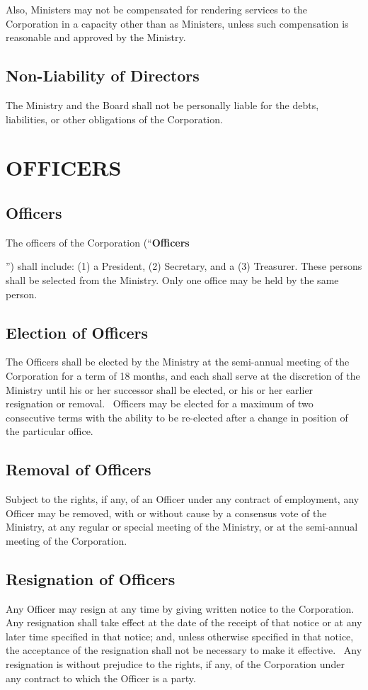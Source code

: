 \documentclass[letterpaper,titlepage]{article}
\newcommand{\defn}[1]{\refstepcounter{defn}\textbf{#1}\addcontentsline{defn}{defn}{\protect\numberline{\thedefn}#1}}
\begin{document}
Also, Ministers may not be compensated for rendering services to the
Corporation in a capacity other than as Ministers, unless such compensation is
reasonable and approved by the Ministry.
\subsection{Non-Liability of Directors}
\label{sec:nonliability}
The Ministry and the Board shall not be personally liable for the debts,
liabilities, or other obligations of the Corporation.
\section{OFFICERS}
\label{sec:officers}
\subsection{Officers}
\label{sec:officers2}
The officers of the Corporation (``\defn{Officers}'') shall include: (1) a
President, (2) Secretary, and a (3) Treasurer. These persons shall be selected
from the Ministry. Only one office may be held by the same person.
\subsection{Election of Officers}
\label{sec:electionOfficers}
The Officers shall be elected by the Ministry at the semi-annual meeting of the
Corporation for a term of 18 months, and each shall serve at the discretion of
the Ministry until his or her successor shall be elected, or his or her earlier
resignation or removal.  Officers may be elected for a maximum of two
consecutive terms with the ability to be re-elected after a change in position
of the particular office. 
\subsection{Removal of Officers}
\label{sec:removalOfficers}
Subject to the rights, if any, of an Officer under any contract of employment,
any Officer may be removed, with or without cause by a consensus vote of
the Ministry, at any regular or special meeting of the Ministry, or at the
semi-annual meeting of the Corporation.
\subsection{Resignation of Officers}
\label{sec:resignationOfficers}
Any Officer may resign at any time by giving written notice to the
Corporation.  Any resignation shall take effect at the date of the receipt of
that notice or at any later time specified in that notice; and, unless
otherwise specified in that notice, the acceptance of the resignation shall not
be necessary to make it effective.  Any resignation is without prejudice to the
rights, if any, of the Corporation under any contract to which the Officer is a
party.
\end{document}
